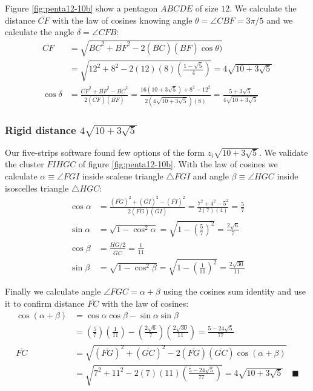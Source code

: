 \documentclass[11pt]{article}
\begin{document}
Figure \ref{fig:penta12-10b} show a pentagon $ABCDE$ of size $12$. We calculate the distance $\overline{CF}$ with the law of cosines knowing angle $\theta = \angle{CBF} = 3\pi / 5$ and we calculate the angle $\delta = \angle{CFB}$:
\begin{align}
\overline{CF} &= \sqrt{\overline{BC}^2 + \overline{BF}^2 
 - 2(\overline{BC})(\overline{BF})\cos\theta)} \nonumber\\
 &= \sqrt{12^2 + 8^2 - 2(12)(8)\left(\frac{1-\sqrt5}4\right)}
 = 4\sqrt{10 + 3\sqrt5} \\
%
\cos\delta &= \frac{\overline{CF}^2 + \overline{BF}^2 - \overline{BC}^2}
 {2(\overline{CF})(\overline{BF})}%
 = \frac{16(10 + 3\sqrt5) + 8^2 - 12^2}{2(4\sqrt{10 + 3\sqrt5})(8)}
  = \frac{5 + 3\sqrt5}{4\sqrt{10 + 3\sqrt5}}
\end{align}

\subsubsection{Rigid distance $4\sqrt{10 + 3\sqrt5}$}

Our five-strips software found few options of the form $z_i\sqrt{10+3\sqrt5}$. We validate the cluster $FIHGC$ of figure \ref{fig:penta12-10b}. With the law of cosines we calculate $\alpha \equiv \angle{FGI}$ inside scalene triangle $\triangle{FGI}$ and angle $\beta \equiv \angle{HGC}$ inside isoscelles triangle $\triangle{HGC}$:
\begin{align}
\cos\alpha &= \frac{(\overline{FG})^2 + (\overline{GI})^2 - (\overline{FI})^2}
 {2(\overline{FG})(\overline{GI})}
 = \frac{7^2 + 4^2 - 5^2}{2(7)(4)} = \frac{5}7 \\
\sin\alpha &= \sqrt{1 - \cos^2\alpha} 
 = \sqrt{1 - \left(\frac{5}7\right)^2} = \frac{2\sqrt6}7 \\
\cos\beta &= \frac{\overline{HG}/2}{\overline{GC}} = \frac{1}{11} \\
\sin\beta &= \sqrt{1 - \cos^2\beta}
 = \sqrt{1 - \left(\frac{1}{11}\right)^2} = \frac{2\sqrt{30}}{11}
\end{align}

Finally we calculate angle $\angle{FGC} = \alpha + \beta$ using the cosines sum identity and use it to confirm distance $\overline{FC}$ with the law of cosines:
\begin{align}
\cos(\alpha + \beta) &= \cos\alpha\cos\beta - \sin\alpha\sin\beta \nonumber\\
 &= \left(\frac{5}7\right)\left(\frac{1}{11}\right) 
  - \left(\frac{2\sqrt6}7\right)\left(\frac{2\sqrt{30}}{11}\right)
  = \frac{5 - 24\sqrt5}{77} \\
%
\overline{FC} &= \sqrt{(\overline{FG})^2 + (\overline{GC})^2 
 - 2(\overline{FG})(\overline{GC})\cos(\alpha+\beta)} \nonumber\\
  &= \sqrt{7^2 + 11^2 - 2(7)(11)\left(\frac{5 - 24\sqrt5}{77}\right)} 
  = 4\sqrt{10 + 3\sqrt5} \quad \blacksquare
\end{align}
\end{document}
